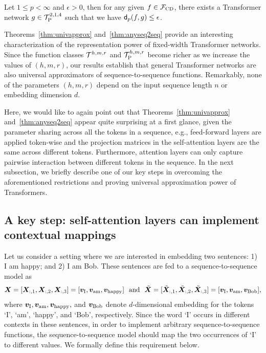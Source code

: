 \begin{theorem}
\label{thm:anyseq2seq}
Let $1 \leq p < \infty$ and $\epsilon > 0$, then for any given $f \in \mathcal{F}_{\rm CD}$, there exists a Transformer network $g \in \mathcal{T}^{2,1,4}_{\rm P}$ such that we have $\mathsf{d}_p(f,g) \leq \epsilon$. 
\end{theorem}
\vspace{-2pt}
Theorems~\ref{thm:univapprox} and~\ref{thm:anyseq2seq} provide an interesting characterization of the representation power of fixed-width Transformer networks. Since the function classes $\mathcal{T}^{h, m, r}$ and $\mathcal{T}^{h, m, r}_{\rm P}$ become richer as we increase the values of $(h, m, r)$, our results establish that general Transformer networks are also universal approximators of sequence-to-sequence functions. Remarkably, none of the parameters $(h, m, r)$ depend on the input sequence length $n$ or embedding dimension $d$. 

Here, we would like to again point out that Theorems~\ref{thm:univapprox} and~\ref{thm:anyseq2seq} appear quite surprising at a first glance, given the parameter sharing across all the tokens in a sequence, e.g., feed-forward layers are applied token-wise and the projection matrices in the self-attention layers are the same across different tokens. Furthermore, attention layers can only capture pairwise interaction between different tokens in the sequence. 
In the next subsection, we briefly describe one of our key steps in overcoming the aforementioned restrictions and proving universal approximation power of Transformers.

\vspace*{-3pt}
\subsection{A key step: self-attention layers can implement contextual mappings}
\vspace*{-3pt}
\label{sec:contextual-mapping}
Let us consider a setting where we are interested in embedding two sentences: 1) I am happy; and 2) I am Bob. These sentences are fed to a sequence-to-sequence model as 
$$
{\bm{X}} = [{\bm{X}}_{:,1}, {\bm{X}}_{:,2}, {\bm{X}}_{:,3}] = [{\bm{v}}_{\rm I}, {\bm{v}}_{\rm am}, {\bm{v}}_{\rm happy}]~~\text{and}~~\tilde{{\bm{X}}} = [\tilde{{\bm{X}}}_{:,1}, \tilde{{\bm{X}}}_{:,2}, \tilde{{\bm{X}}}_{:,3}] = [{\bm{v}}_{\rm I}, {\bm{v}}_{\rm am}, {\bm{v}}_{\rm Bob}],
$$
where ${\bm{v}}_{\rm I}, {\bm{v}}_{\rm am}, {\bm{v}}_{\rm happy},$ and ${\bm{v}}_{\rm Bob}$ denote $d$-dimensional embedding for the tokens `I', `am', `happy', and `Bob', respectively. Since the word `I' occurs in different contexts in these sentences, in order to implement arbitrary sequence-to-sequence functions, the sequence-to-sequence model should map the two occurrences of `I' to different values. We formally define this requirement below.

